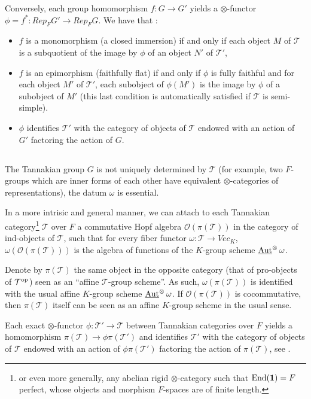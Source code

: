 \documentclass[../main.tex]{subfiles}
\begin{document}
Conversely, each group homomorphism $f : G \to G'$ yields a $\otimes$-functor $\phi = f^* : Rep_F G' \to Rep_F G$.
We have that :
\begin{itemize}
    \item $f$ is a monomorphism (a closed immersion) if and only if each object $M$ of $\mathcal{T}$ is a subquotient of the image by $\phi$ of an object $N'$ of $\mathcal{T}'$,
    \item $f$ is an epimorphism (faithfully flat) if and only if $\phi$ is fully faithful and for each object $M'$ of $\mathcal{T}'$, each subobject of $\phi(M')$ is the image by $\phi$ of a subobject of $M'$ (this last condition is automatically satisfied if $\mathcal{T}$ is semi-simple).
    \item $\phi$ identifies $\mathcal{T}'$ with the category of objects of $\mathcal{T}$ endowed with an action of $G'$ factoring the action of $G$.
\end{itemize}

\subsection{} The Tannakian group $G$ is not uniquely determined by $\mathcal{T}$ (for example, two $F$-groups which are inner forms of each other have equivalent $\otimes$-categories of representations), the datum $\omega$ is essential.

In a more intrisic and general manner, we can attach to each Tannakian category\footnote{or even more generally, any abelian rigid $\otimes$-category such that $\operatorname{End}(\mathbf{1}) = F$ perfect, whose objects and morphism $F$-spaces are of finite length.} $\mathcal{T}$ over $F$ a commutative Hopf algebra $\mathcal{O}(\pi(\mathcal{T}))$ in the category of ind-objects of $\mathcal{T}$, such that for every fiber functor $\omega : \mathcal{T} \to Vec_K$, $\omega(\mathcal{O}(\pi(\mathcal{T})))$ is the algebra of functions of the $K$-group scheme $\operatorname{\underline{Aut}}^{\otimes} \omega$.

Denote by $\pi(\mathcal{T})$ the same object in the opposite category (that of pro-objects of $\mathcal{T}^{\mathrm{op}}$) seen as an \enquote{affine $\mathcal{T}$-group scheme}.
As such, $\omega(\pi(\mathcal{T}))$ is identified with the usual affine $K$-group scheme $\operatorname{\underline{Aut}}^{\otimes} \omega$.
If $\mathcal{O}(\pi(\mathcal{T}))$ is cocommutative, then $\pi(\mathcal{T})$ itself can be seen as an affine $K$-group scheme in the usual sense.

Each exact $\otimes$-functor $\phi : \mathcal{T}' \to \mathcal{T}$ between Tannakian categories over $F$ yields a homomorphism $\pi(\mathcal{T}) \to \phi\pi(\mathcal{T}')$ and identifies $\mathcal{T}'$ with the category of objects of $\mathcal{T}$ endowed with an action of $\phi\pi(\mathcal{T}')$ factoring the action of $\pi(\mathcal{T})$, see \cite{deligne90}.
\end{document}
